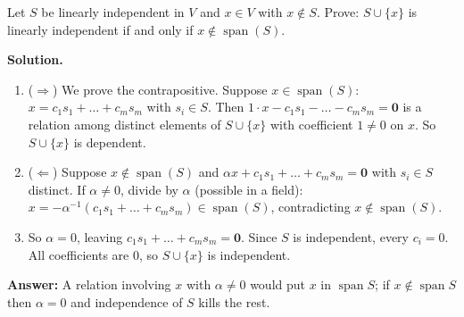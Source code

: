 \documentclass[11pt]{article}
\begin{document}
\begin{tcolorbox}[breakable,colback=white,colframe=ink!60,title={\bfseries Example 8 \textperiodcentered\ Proof: the Extension Lemma}]Let $S$ be linearly independent in $V$ and $x\in V$ with $x\notin S$. Prove: $S\cup\{x\}$ is linearly independent if and only if $x\notin\operatorname{span}(S)$.
\par\smallskip
\textbf{Solution.} \begin{enumerate}[leftmargin=1.6em,itemsep=1pt,topsep=2pt,label=\arabic*.]\item ($\Rightarrow$) We prove the contrapositive. Suppose $x\in\operatorname{span}(S)$: $x=c_1s_1+\dots+c_ms_m$ with $s_i\in S$. Then $1\cdot x-c_1s_1-\dots-c_ms_m=\mathbf 0$ is a relation among distinct elements of $S\cup\{x\}$ with coefficient $1\neq0$ on $x$. So $S\cup\{x\}$ is dependent.
\item ($\Leftarrow$) Suppose $x\notin\operatorname{span}(S)$ and $\alpha x+c_1s_1+\dots+c_ms_m=\mathbf 0$ with $s_i\in S$ distinct. If $\alpha\neq0$, divide by $\alpha$ (possible in a field): $x=-\alpha^{-1}(c_1s_1+\dots+c_ms_m)\in\operatorname{span}(S)$, contradicting $x\notin\operatorname{span}(S)$.
\item So $\alpha=0$, leaving $c_1s_1+\dots+c_ms_m=\mathbf 0$. Since $S$ is independent, every $c_i=0$. All coefficients are $0$, so $S\cup\{x\}$ is independent.
\end{enumerate}\textbf{Answer:} A relation involving $x$ with $\alpha\neq0$ would put $x$ in $\operatorname{span}S$; if $x\notin\operatorname{span}S$ then $\alpha=0$ and independence of $S$ kills the rest.
\end{tcolorbox}
\newpage
\end{document}
